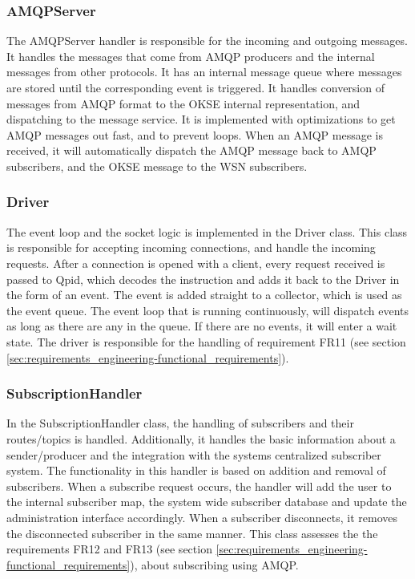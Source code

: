 \subsubsection{AMQPServer}
The AMQPServer handler is responsible for the incoming and outgoing messages. It handles the messages that come from AMQP producers and the internal messages from other protocols. It has an internal message queue where messages are stored until the corresponding event is triggered. It handles conversion of messages from AMQP format to the OKSE internal representation, and dispatching to the message service. It is implemented with optimizations to get AMQP messages out fast, and to prevent loops. When an AMQP message is received, it will automatically dispatch the AMQP message back to AMQP subscribers, and the OKSE message to the WSN subscribers.

\subsubsection{Driver}
The event loop and the socket logic is implemented in the Driver class. This class is responsible for accepting incoming connections, and handle the incoming requests. After a connection is opened with a client, every request received is passed to Qpid, which decodes the instruction and adds it back to the Driver in the form of an event. The event is added straight to a collector, which is used as the event queue. The event loop that is running continuously, will dispatch events as long as there are any in the queue. If there are no events, it will enter a wait state. The driver is responsible for the handling of requirement FR11 (see section \ref{sec:requirements_engineering-functional_requirements}).

\subsubsection{SubscriptionHandler}
In the SubscriptionHandler class, the handling of subscribers and their routes/topics is handled. Additionally, it handles the basic information about a sender/producer and the integration with the systems centralized subscriber system. The functionality in this handler is based on addition and removal of subscribers. When a subscribe request occurs, the handler will add the user to the internal subscriber map, the system wide subscriber database and update the administration interface accordingly. When a subscriber disconnects, it removes the disconnected subscriber in the same manner. This class assesses the the requirements FR12 and FR13 (see section \ref{sec:requirements_engineering-functional_requirements}), about subscribing using AMQP.

